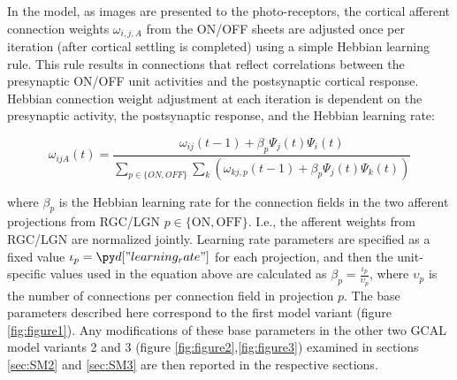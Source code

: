 \documentclass[utf8]{frontiersSCNS}
\begin{document}
In the model, as images are presented to the photo-receptors, the cortical afferent connection weights $\omega_{i,j,A}$ from the ON/OFF sheets are adjusted once per iteration (after cortical settling is completed) using a simple Hebbian learning rule. This rule results in connections that reflect correlations between the presynaptic ON/OFF unit activities and the postsynaptic cortical response. Hebbian connection weight adjustment at each iteration is dependent on the presynaptic activity, the postsynaptic response, and the Hebbian learning rate:

\begin{equation}
\omega_{ijA}(t)=\frac{\omega_{ij}(t-1)+\beta_{p}\Psi_{j}(t)\Psi_{i}(t)}{\sum_{p \in \{ON,OFF\}}\sum_{k}\left(\omega_{kj,p}(t-1)+\beta_{p}\Psi_{j}(t)\Psi_{k}(t)\right)}
\end{equation}

\noindent where $\beta_{p}$ is the Hebbian learning rate for the connection fields in the two afferent projections from RGC/LGN $p \in \{\mathrm{ON},\mathrm{OFF}\}$. I.e., the afferent weights from RGC/LGN are normalized jointly.  Learning rate parameters are specified as
a fixed value $\iota_{p}=\insval{learning_rate}$ for each projection, and then the unit-specific values used in the equation above are calculated as
$\beta_{p}=\frac{\iota_{p}}{\upsilon_{p}}$, where $\upsilon_{p}$ is the number of connections per connection field in projection $p$.  
The base parameters described here correspond to the first model variant (figure \ref{fig:figure1}). Any modifications of these base parameters in the other two GCAL model variants 2 and 3 (figure \ref{fig:figure2},\ref{fig:figure3}) examined in 
sections \ref{sec:SM2} and \ref{sec:SM3} are then reported in the respective sections.
\end{document}

